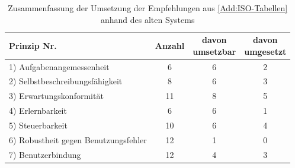 
\begin{table}[H]
    \centering
    \begin{tabular}{|l|c|c|c|}
        \hline
        Prinzip Nr. & Anzahl & \makecell{davon\\umsetzbar} & \makecell{davon\\umgesetzt} \\ \hline
        1) Aufgabenangemessenheit              & 6  & 6 & 2 \\ \hline
        2) Selbstbeschreibungsfähigkeit        & 8  & 6 & 3 \\ \hline
        3) Erwartungskonformität               & 11 & 8 & 5 \\ \hline
        4) Erlernbarkeit                       & 6  & 6 & 1 \\ \hline
        5) Steuerbarkeit                       & 10 & 6 & 4 \\ \hline
        6) Robustheit gegen Benutzungsfehler   & 12 & 1 & 0 \\ \hline
        7) Benutzerbindung                     & 12 & 4 & 3 \\ \hline
    \end{tabular}
    \caption{Zusammenfassung der Umsetzung der Empfehlungen aus \autoref{Add:ISO-Tabellen} anhand des alten Systems}
    \label{tab:Zusammenfassung:ISO-Tabellen:alt_Zustand}
\end{table}
